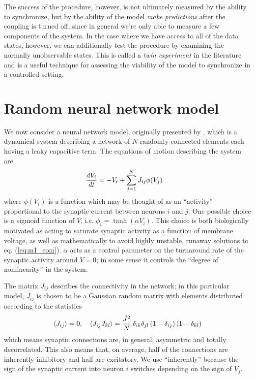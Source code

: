 \documentclass{article} %
\begin{document}
The success of the procedure, however, is not ultimately measured by the ability to synchronize, but by the ability of the model \emph{make predictions} after the coupling is turned off, since in general we're only able to measure a few components of the system.  In the case where we have access to all of the data states, however, we can additionally test the procedure by examining the normally unobservable states.  This is called a \emph{twin experiment} in the literature and is a useful technique for assessing the viability of the model to synchronize in a controlled setting.

\section{Random neural network model}
We now consider a neural network model, originally presented by \cite{Sompolinsky1988}, which is a dynamical system describing a network of $N$ randomly connected elements each having a leaky capacitive term.  The equations of motion describing the system are
\begin{align}
	\frac{d V_i}{d t} &= -V_i + \sum_{j=1}^{N} J_{ij} \phi(V_j) \label{eq:m1_eom}
\end{align}
where $\phi(V_i)$ is a function which may be thought of as an ``activity'' proportional to the synaptic current between neurons $i$ and $j$.  One possible choice is a sigmoid function of $V$, i.e. $\phi_i = \tanh\left(\alpha V_i\right)$.  This choice is both biologically motivated as acting to saturate synaptic activity as a function of membrane voltage, as well as mathematically to avoid highly unstable, runaway solutions to eq. (\ref{eq:m1_eom}).  $\alpha$ acts as a control parameter on the turnaround rate of the synaptic activity around $V = 0$; in some sense it controls the ``degree of nonlinearity'' in the system.

The matrix $J_{ij}$ describes the connectivity in the network; in this particular model, $J_{ij}$ is chosen to be a Gaussian random matrix with elements distributed according to the statistics
\begin{align}
	\left\langle J_{ij} \right\rangle = 0, \quad \left\langle J_{ij}J_{kl} \right\rangle = \frac{\tilde{J}^2}{N} \: \delta_{ik}\delta_{jl} \left(1 - \delta_{ij}\right) \left(1 - \delta_{kl}\right) \label{eq:m1_stats}
\end{align}
which means synaptic connections are, in general, asymmetric and totally decorrelated.  This also means that, on average, half of the connections are inherently inhibitory and half are excitatory.  We use ``inherently'' because the sign of the synaptic current into neuron $i$ switches depending on the sign of $V_j$.
\end{document}
